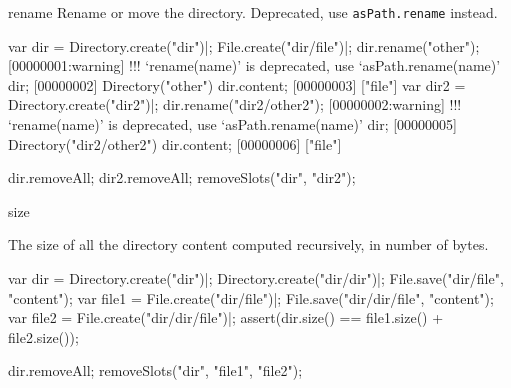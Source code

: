 \begin{urbiscriptapi}
\item[rename] Rename or move the directory. Deprecated, use
  \lstinline|asPath.rename| instead.
\begin{urbiscript}
var dir = Directory.create("dir")|;
File.create("dir/file")|;
dir.rename("other");
[00000001:warning] !!! `rename(name)' is deprecated, use `asPath.rename(name)'
dir;
[00000002] Directory("other")
dir.content;
[00000003] ["file"]
var dir2 = Directory.create("dir2")|;
dir.rename("dir2/other2");
[00000002:warning] !!! `rename(name)' is deprecated, use `asPath.rename(name)'
dir;
[00000005] Directory("dir2/other2")
dir.content;
[00000006] ["file"]
\end{urbiscript}
\begin{urbicomment}
dir.removeAll;
dir2.removeAll;
removeSlots("dir", "dir2");
\end{urbicomment}


\item[size]
  \experimental{}

  The size of all the directory content computed recursively, in number of
  bytes.
\begin{urbiscript}
var dir = Directory.create("dir")|;
Directory.create("dir/dir")|;
File.save("dir/file", "content");
var file1 = File.create("dir/file")|;
File.save("dir/dir/file", "content");
var file2 = File.create("dir/dir/file")|;
assert(dir.size() == file1.size() + file2.size());
\end{urbiscript}
\begin{urbicomment}
dir.removeAll;
removeSlots("dir", "file1", "file2");
\end{urbicomment}
\end{urbiscriptapi}

